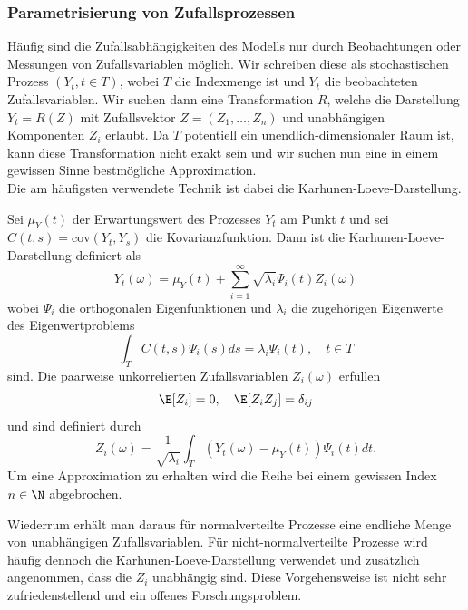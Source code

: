 \subsubsection{Parametrisierung von Zufallsprozessen}
Häufig sind die Zufallsabhängigkeiten des Modells nur durch Beobachtungen oder Messungen von Zufallsvariablen möglich. Wir schreiben diese als stochastischen Prozess $(Y_t,t\in T)$, wobei $T$ die Indexmenge ist und $Y_t$ die beobachteten Zufallsvariablen. Wir suchen dann eine Transformation $R$, welche die Darstellung $Y_t=R(Z)$ mit Zufallsvektor $Z=(Z_1,\dots,Z_n)$ und unabhängigen Komponenten $Z_i$ erlaubt. Da $T$ potentiell ein unendlich-dimensionaler Raum ist, kann diese Transformation nicht exakt sein und wir suchen nun eine in einem gewissen Sinne bestmögliche Approximation.\\
Die am häufigsten verwendete Technik ist dabei die Karhunen-Loeve-Darstellung.
\begin{mathdef}
Sei $\mu_Y(t)$ der Erwartungswert des Prozesses $Y_t$ am Punkt $t$ und sei $C(t,s)=\text{cov}(Y_t,Y_s)$ die Kovarianzfunktion. Dann ist die Karhunen-Loeve-Darstellung definiert als
\[Y_t(\omega)=\mu_Y(t)+\sum_{i=1}^\infty \sqrt{\lambda_i}\Psi_i(t)Z_i(\omega)\] wobei $\Psi_i$ die orthogonalen Eigenfunktionen und $\lambda_i$ die zugehörigen Eigenwerte des Eigenwertproblems
\[\int_T C(t,s)\Psi_i(s)ds=\lambda_i\Psi_i(t),\quad t\in T\]
sind. Die paarweise unkorrelierten Zufallsvariablen $Z_i(\omega)$ erfüllen
\[\E[Z_i]=0,\quad \E[Z_iZ_j]=\delta_{ij}\]
und sind definiert durch
\[Z_i(\omega)=\frac{1}{\sqrt{\lambda_i}}\int_T (Y_t(\omega)-\mu_Y(t))\Psi_i(t)dt.\]
Um eine Approximation zu erhalten wird die Reihe bei einem gewissen Index $n\in\N$ abgebrochen.
\end{mathdef}
Wiederrum erhält man daraus für normalverteilte Prozesse eine endliche Menge von unabhängigen Zufallsvariablen. Für nicht-normalverteilte Prozesse wird häufig dennoch die Karhunen-Loeve-Darstellung verwendet und zusätzlich angenommen, dass die $Z_i$ unabhängig sind. Diese Vorgehensweise ist nicht sehr zufriedenstellend und ein offenes Forschungsproblem.

